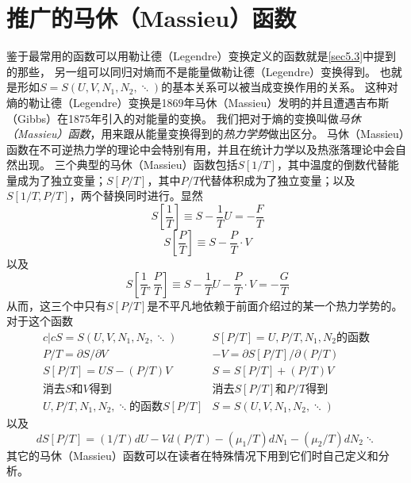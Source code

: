 \section{推广的马休（Massieu）函数}
\label{sec5.4}

鉴于最常用的函数可以用勒让德（Legendre）变换定义的函数就是\ref{sec5.3}中提到的那些，
另一组可以同归对熵而不是能量做勒让德（Legendre）变换得到。
也就是形如$S=S(U,V,N_1,N_2,\ddots)$的基本关系可以被当成变换作用的关系。
这种对熵的勒让德（Legendre）变换是1869年马休（Massieu）发明的并且遭遇吉布斯（Gibbs）在1875年引入的对能量的变换。
我们把对于熵的变换叫做{\it 马休（Massieu）函数}，用来跟从能量变换得到的{\it 热力学势}做出区分。
马休（Massieu）函数在不可逆热力学的理论中会特别有用，并且在统计力学以及热涨落理论中会自然出现。
三个典型的马休（Massieu）函数包括$S[1/T]$，其中温度的倒数代替能量成为了独立变量；$S[P/T]$，其中$P/T$代替体积成为了独立变量；以及$S[1/T,P/T]$，两个替换同时进行。显然
\begin{equation}
\label{equ5.61}\
  S\left[\frac{1}{T}\right]\equiv S-\frac{1}{T}U=-\frac{F}{T}
\end{equation}
\begin{equation}
\label{equ5.62}\
  S\left[\frac{P}{T}\right]\equiv S-\frac{P}{T}\cdot V
\end{equation}
以及
\begin{equation}
\label{equ5.63}\
  S\left[\frac{1}{T},\frac{P}{T}\right]\equiv S-\frac{1}{T}U-\frac{P}{T}\cdot V=-\frac{G}{T}
\end{equation}
从而，这三个中只有$S[P/T]$是不平凡地依赖于前面介绍过的某一个热力学势的。
对于这个函数
\begin{eqnarray}{c|c}
S=S(U,V,N_1,N_2,\ddots) & S[P/T]=U,P/T,N_1,N_2\text{的函数}\label{equ5.64}\\
P/T=\partial S/\partial V & -V=\partial S[P/T]/\partial(P/T)\label{equ5.65} \\
S[P/T]=US-(P/T)V & S=S[P/T]+(P/T)V \label{equ5.66} \\
\text{消去$S$和$V$得到} & \text{消去$S[P/T]$和$P/T$得到}\nonumber\\
U,P/T,N_1,N_2,\ddots\text{的函数}S[P/T] & S=S(U,V,N_1,N_2,\ddots)\nonumber
\end{eqnarray}
以及
\begin{equation}
\label{5.67}
dS[P/T]=(1/T)dU-Vd(P/T)-(\mu_1/T)dN_1-(\mu_2/T)dN_2\ddots
\end{equation}
其它的马休（Massieu）函数可以在读者在特殊情况下用到它们时自己定义和分析。
